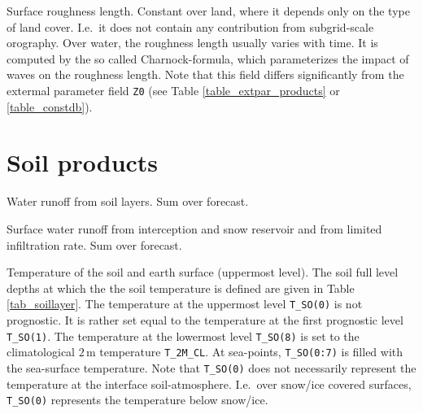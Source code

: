\begin{description}[leftmargin=3.0cm,style=sameline]
 \item [Z0]     Surface roughness length. Constant over land, where it depends only on the type of land cover. I.e.\ it does 
                not contain any contribution from subgrid-scale orography. Over water, the roughness length usually varies 
                with time. It is computed by the so called Charnock-formula, which parameterizes the impact of waves on the 
                roughness length. Note that this field differs significantly from the extermal parameter field \texttt{Z0} 
                (see Table \ref{table_extpar_products} or \ref{table_constdb}).  
\end{description}


\section{Soil products}
\begin{description}[leftmargin=3.0cm,style=sameline]
 \item [RUNOFF\_G] Water runoff from soil layers. Sum over forecast.

 \item [RUNOFF\_S] Surface water runoff from interception and snow reservoir and from limited infiltration rate. Sum over forecast.

 \item [T\_SO] Temperature of the soil and earth surface (uppermost level). The soil full level depths at which the 
               the soil temperature is defined are given in Table \ref{tab_soillayer}. The temperature at the uppermost 
               level \texttt{T\_SO(0)} is not prognostic. It is rather set equal to the temperature at the first prognostic 
               level \texttt{T\_SO(1)}. The temperature at the lowermost level \texttt{T\_SO(8)} is set to the climatological 
               $2\,\mathrm{m}$ temperature \texttt{T\_2M\_CL}. At sea-points, \texttt{T\_SO(0:7)} is filled with the sea-surface 
               temperature. Note that \texttt{T\_SO(0)} does not necessarily represent the temperature at the interface soil-atmosphere. 
               I.e.\ over snow/ice covered surfaces, \texttt{T\_SO(0)} represents the temperature below snow/ice.
\end{description}


